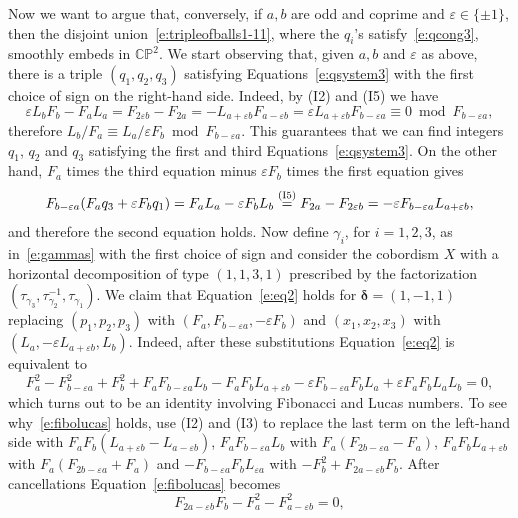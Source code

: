\documentclass[11pt,a4paper]{amsart}
\newcommand{\CP}{\mathbb{CP}}
\newcommand{\de}{\delta}
\newcommand{\ep}{\varepsilon}
\newcommand{\ga}{\gamma}
\newcommand{\bde}{\bm{\de}}
\theoremstyle{definition}
\numberwithin{equation}{section}
\begin{document}
Now we want to argue that, conversely, if $a,b$ are odd and coprime and $\ep\in\{\pm 1\}$, then the disjoint union~\eqref{e:tripleofballs1-11}, where the $q_i$'s 
satisfy~\eqref{e:qcong3}, smoothly embeds in $\CP^2$. 
We start observing that, given $a,b$ and $\ep$ as above, 
there is a triple $(q_1,q_2,q_3)$ satisfying 
Equations~\eqref{e:qsystem3} with the first choice of sign on the right-hand side. 
Indeed, by (I2) and (I5) we have
\[
\ep L_b F_b - F_a L_a = F_{2\ep b} - F_{2a} = 
- L_{a+\ep b} F_{a - \ep b} = \ep L_{a+\ep b} F_{b-\ep a} \equiv 0\bmod F_{b-\ep a},
\]
therefore $L_b/F_a\equiv L_a/\ep F_b\bmod F_{b-\ep a}$. This guarantees that we can find 
integers $q_1$, $q_2$ and $q_3$ satisfying the first and third Equations~\eqref{e:qsystem3}.
On the other hand, $F_a$ times the third equation minus $\ep F_b$ times the first 
equation gives 
\[
F_{b-\ep a}(F_a q_3 + \ep F_b q_1) = F_a L_a - \ep F_b L_b 
\stackrel{{\rm (I5)}}{=} F_{2a} - F_{2\ep b} = -\ep F_{b-\ep a} L_{a+\ep b},
\]
and therefore the second equation holds.  
Now define $\ga_i$, for $i=1,2,3$, as in~\eqref{e:gammas} with the first choice of sign 
and consider the cobordism $X$ with a horizontal decomposition of type $(1,1,3,1)$ 
prescribed by the factorization $(\tau_{\ga_3},\tau_{\ga_2}^{-1},\tau_{\ga_1})$.
We claim that Equation~\eqref{e:eq2} holds for $\bde = (1,-1,1)$ replacing $(p_1,p_2,p_3)$ with 
$(F_a,F_{b-\ep a},-\ep F_b)$ and $(x_1,x_2,x_3)$ with $(L_a,-\ep L_{a+\ep b}, L_b)$. 
Indeed, after these substitutions Equation~\eqref{e:eq2} is equivalent to  
\begin{equation}\label{e:fibolucas}
F_a^2 - F_{b-\ep a}^2 + F_b^2 + F_a F_{b-\ep a} L_b - F_a F_b L_{a+\ep b} 
- \ep F_{b-\ep a} F_b L_a + \ep F_a F_b L_a L_b = 0,    
\end{equation}
which turns out to be an identity involving Fibonacci and Lucas numbers. To see 
why~\eqref{e:fibolucas} holds, use (I2) and (I3) to replace the last term on the 
left-hand side with $F_a F_b (L_{a+\ep b} - L_{a-\ep b})$, $F_a F_{b-\ep a} L_b$ 
with $F_a (F_{2b-\ep a}-F_a)$, $F_a F_b L_{a+\ep b}$ with $F_a (F_{2b-\ep a} + F_a)$
and $-F_{b-\ep a} F_b L_{\ep a}$ with $-F_b^2 + F_{2a-\ep b} F_b$. 
After cancellations Equation~\eqref{e:fibolucas} becomes
\[
F_{2a-\ep b} F_b - F_a^2 - F_{a-\ep b}^2 = 0,
\]
\end{document}
